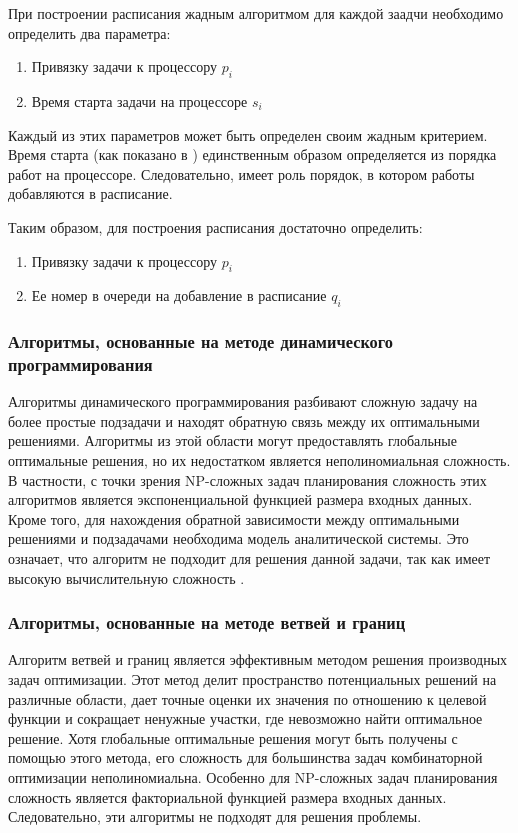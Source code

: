 При построении расписания жадным алгоритмом для каждой заадчи необходимо определить два параметра:
\begin{enumerate}
    \item Привязку задачи к процессору $p_i$
    \item Время старта задачи на процессоре $s_i$
\end{enumerate}
Каждый из этих параметров может быть определен своим жадным критерием. Время старта (как показано в \cite{Kalashnikov_2004}) единственным образом определяется из порядка работ на процессоре. Следовательно, имеет роль порядок, в котором работы добавляются в расписание.

Таким образом, для построения расписания достаточно определить:
\begin{enumerate}
    \item Привязку задачи к процессору $p_i$
    \item Ее номер в очереди на добавление в расписание $q_i$
\end{enumerate}

\subsubsection{Алгоритмы, основанные на методе динамического программирования}

Алгоритмы динамического программирования разбивают сложную задачу на более простые подзадачи и находят обратную связь между их оптимальными решениями. Алгоритмы из этой области могут предоставлять глобальные оптимальные решения, но их недостатком является неполиномиальная сложность. В частности, с точки зрения NP-сложных задач планирования сложность этих алгоритмов является экспоненциальной функцией размера входных данных. Кроме того, для нахождения обратной зависимости между оптимальными решениями и подзадачами необходима модель аналитической системы. Это означает, что алгоритм не подходит для решения данной задачи, так как имеет высокую вычислительную сложность \cite{Dynamic_prog}.

\subsubsection{Алгоритмы, основанные на методе ветвей и границ}

Алгоритм ветвей и границ является эффективным методом решения производных задач оптимизации. Этот метод делит пространство потенциальных решений на различные области, дает точные оценки их значения по отношению к целевой функции и сокращает ненужные участки, где невозможно найти оптимальное решение. Хотя глобальные оптимальные решения могут быть получены с помощью этого метода, его сложность для большинства задач комбинаторной оптимизации неполиномиальна. Особенно для NP-сложных задач планирования сложность является факториальной функцией размера входных данных. Следовательно, эти алгоритмы не подходят для решения проблемы.

